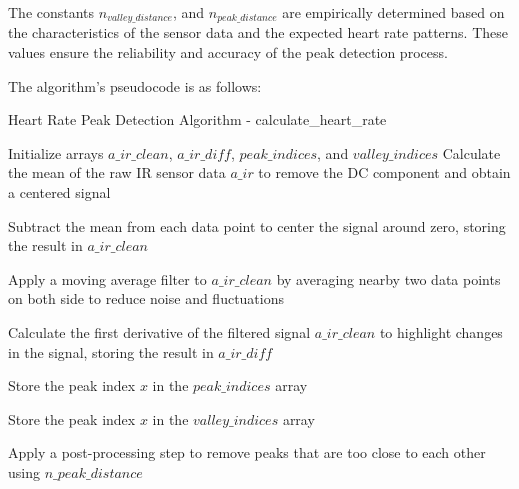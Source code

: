 \noindent The constants \(n_{valley\_distance}\), and \(n_{peak\_distance}\) are empirically determined based on the characteristics of the sensor data and the expected heart rate patterns. These values ensure the reliability and accuracy of the peak detection process.

\noindent The algorithm's pseudocode is as follows:

\begin{algorithm}[H]
\caption{Heart Rate Peak Detection Algorithm - calculate\_heart\_rate}
\begin{algorithmic}[1]
    \State Initialize arrays $a\_ir\_clean$, $a\_ir\_diff$, $peak\_indices$, and $valley\_indices$
    \State Calculate the mean of the raw IR sensor data $a\_ir$ to remove the DC component and obtain a centered signal
    
        \State Subtract the mean from each data point to center the signal around zero, storing the result in $a\_ir\_clean$
    \EndFor
    
        \State Apply a moving average filter to $a\_ir\_clean$ by averaging nearby two data points on both side to reduce noise and fluctuations
    \EndFor
    
        \State Calculate the first derivative of the filtered signal $a\_ir\_clean$ to highlight changes in the signal, storing the result in $a\_ir\_diff$
    \EndFor

            \State Store the peak index $x$ in the $peak\_indices$ array
        \EndIf
    \EndFor

            \State Store the peak index $x$ in the $valley\_indices$ array
        \EndIf
    \EndFor
    
    \State Apply a post-processing step to remove peaks that are too close to each other using $n\_peak\_distance$
    

\end{algorithmic}
\end{algorithm}
